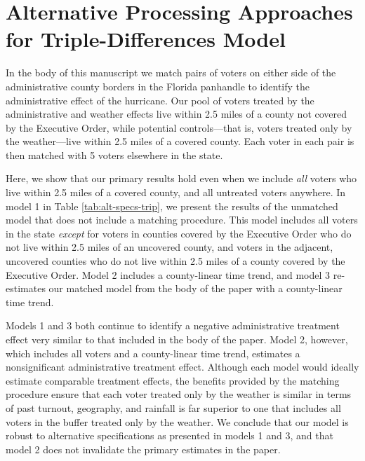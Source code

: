 \documentclass[
  12pt,
]{article}
\begin{document}
\hypertarget{alternative-processing-approaches-for-triple-differences-model}{%
\section*{Alternative Processing Approaches for Triple-Differences Model}\label{alternative-processing-approaches-for-triple-differences-model}}

In the body of this manuscript we match pairs of voters on either side of the administrative county borders in the Florida panhandle to identify the administrative effect of the hurricane. Our pool of voters treated by the administrative and weather effects live within 2.5 miles of a county not covered by the Executive Order, while potential controls---that is, voters treated only by the weather---live within 2.5 miles of a covered county. Each voter in each pair is then matched with 5 voters elsewhere in the state.

Here, we show that our primary results hold even when we include \emph{all} voters who live within 2.5 miles of a covered county, and all untreated voters anywhere. In model 1 in Table \ref{tab:alt-specs-trip}, we present the results of the unmatched model that does not include a matching procedure. This model includes all voters in the state \emph{except} for voters in counties covered by the Executive Order who do not live within 2.5 miles of an uncovered county, and voters in the adjacent, uncovered counties who do not live within 2.5 miles of a county covered by the Executive Order. Model 2 includes a county-linear time trend, and model 3 re-estimates our matched model from the body of the paper with a county-linear time trend.

\begin{singlespace}

\end{singlespace}

Models 1 and 3 both continue to identify a negative administrative treatment effect very similar to that included in the body of the paper. Model 2, however, which includes all voters and a county-linear time trend, estimates a nonsignificant administrative treatment effect. Although each model would ideally estimate comparable treatment effects, the benefits provided by the matching procedure ensure that each voter treated only by the weather is similar in terms of past turnout, geography, and rainfall is far superior to one that includes all voters in the buffer treated only by the weather. We conclude that our model is robust to alternative specifications as presented in models 1 and 3, and that model 2 does not invalidate the primary estimates in the paper.
\end{document}
